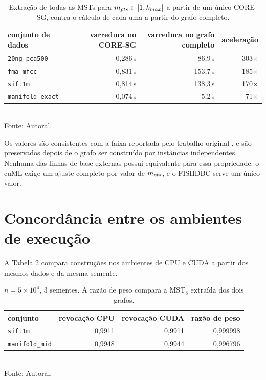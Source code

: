 \begin{table}[htb!]
\caption{\label{tab:mpts} Extração de todas as \ac{MST}s para $m_{pts} \in [1, k_{max}]$ a partir de um único \ac{CORE-SG}, contra o cálculo de cada uma a partir do grafo completo.}
\centering
\footnotesize
\begin{tabular}{@{}lrrr@{}}
\toprule
conjunto de dados & varredura no CORE-SG & varredura no grafo completo & aceleração \\
\midrule
\texttt{20ng\_pca500}   & 0,286\,s & 86,9\,s  & 303$\times$ \\
\texttt{fma\_mfcc}      & 0,831\,s & 153,7\,s & 185$\times$ \\
\texttt{sift1m}         & 0,814\,s & 138,3\,s & 170$\times$ \\
\texttt{manifold\_exact}& 0,074\,s & 5,2\,s   & 71$\times$ \\
\bottomrule
\end{tabular}\\
Fonte: Autoral.
\end{table}

Os valores são consistentes com a faixa reportada pelo trabalho original \cite{core-sg}, e são preservados depois de o grafo ser construído por instâncias independentes. Nenhuma das linhas de base externas possui equivalente para essa propriedade: o cuML exige um ajuste completo por valor de $m_{pts}$, e o FISHDBC serve um único valor.\\

\section{Concordância entre os ambientes de execução\label{sec:res-parity}}

A Tabela \ref{tab:parity} compara construções nos ambientes de \ac{CPU} e \ac{CUDA} a partir dos mesmos dados e da mesma semente.\\

\begin{table}[htb!]
\caption{\label{tab:parity} $n = 5 \times 10^4$, 3 sementes. A razão de peso compara a $\mathrm{MST}_{8}$ extraída dos dois grafos.}
\centering
\footnotesize
\begin{tabular}{@{}lrrr@{}}
\toprule
conjunto & revocação \ac{CPU} & revocação \ac{CUDA} & razão de peso \\
\midrule
\texttt{sift1m}        & 0,9911 & 0,9911 & 0,999998 \\
\texttt{manifold\_mid} & 0,9948 & 0,9944 & 0,996796 \\
\bottomrule
\end{tabular}\\
Fonte: Autoral.
\end{table}

